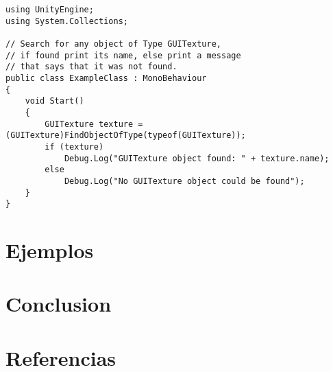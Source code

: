 \documentclass{pre-tfg}
\begin{document}
\begin{lstlisting}[caption=Búsqueda de objetos por tipo, label=lst:tipo]
using UnityEngine;
using System.Collections;

// Search for any object of Type GUITexture,
// if found print its name, else print a message
// that says that it was not found.
public class ExampleClass : MonoBehaviour
{
    void Start()
    {
        GUITexture texture = (GUITexture)FindObjectOfType(typeof(GUITexture));
        if (texture)
            Debug.Log("GUITexture object found: " + texture.name);
        else
            Debug.Log("No GUITexture object could be found");
    }
}
\end{lstlisting}



\section{Ejemplos}

\section{Conclusion}


\section{Referencias}

\clearpage

\printbibliography
\end{document}
